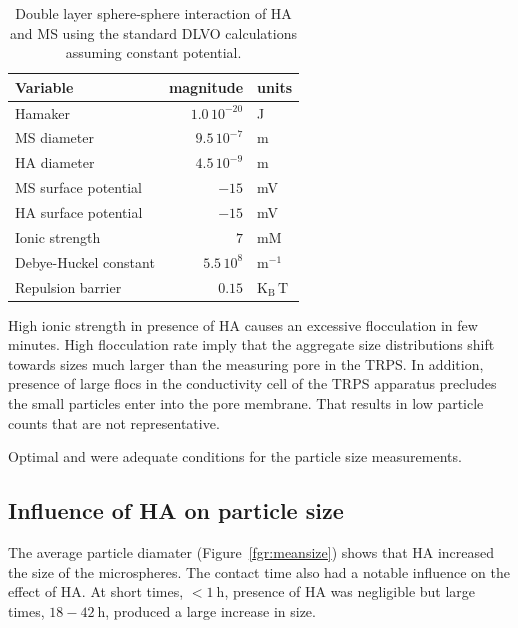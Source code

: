 \documentclass[journal=langd5,manuscript=article]{achemso}
\begin{document}
\begin{table}
\caption{Double layer sphere-sphere interaction  of HA and MS using the standard DLVO calculations assuming constant potential.}
\label{tbl:dvlo_interaction}
\begin{tabular}{lrl}
Variable & magnitude & units\\
\hline
Hamaker & $1.0\,10^{-20}$ & J\\
MS  diameter & $9.5\, 10^{-7}$ & m\\
HA  diameter & $4.5\, 10^{-9}$ & m\\
MS surface potential & $-15$ & mV\\
HA surface potential & $-15$ & mV\\
Ionic strength & $7$ & mM \\
Debye-Huckel constant & $5.5\,10^8$ & $\mathrm{m^{-1}}$\\
Repulsion barrier & $0.15$ & $\mathrm{K_B\,T}$\\
\hline
\end{tabular}
\end{table}





High ionic strength in presence of HA causes an excessive flocculation in
few minutes. 
High flocculation rate imply that the aggregate size distributions shift towards sizes much larger than the measuring pore in the TRPS.
In addition, presence of large flocs in the conductivity cell of the TRPS apparatus precludes the 
small particles enter into the pore membrane. That results in low particle counts that are not representative.

Optimal 
and  %
were adequate conditions for the particle size measurements.




\subsection{Influence of HA on particle size}

The average particle diamater (Figure~\ref{fgr:meansize})
shows that HA increased the size of the microspheres. The contact time also had a notable influence on the effect of HA. At short times,
$< 1~\mathrm{h}$, 
presence of HA was negligible but large times, 
$18 - 42~\mathrm{h}$,
produced a large increase in size.
\end{document}
